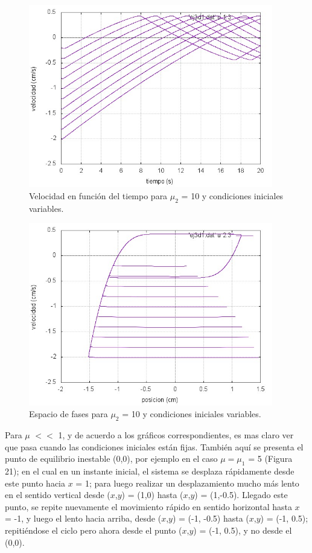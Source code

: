 \documentclass[a4paper,12pt]{article}
\begin{document}
\begin{itemize}
\begin{figure}[H]
\begin{center}
\includegraphics[height=8cm]{grafico_ej3d1_vVSt.jpg}
\caption[width=5cm]{Velocidad en funci\'on del tiempo para $\mu_2$ = 10 y condiciones iniciales variables.}
\end{center}
\end{figure}

\begin{figure}[H]
\begin{center}
\includegraphics[height=8cm]{grafico_ej3d1_xVSv.jpg}
\caption[width=5cm]{Espacio de fases para $\mu_2$ = 10 y condiciones iniciales variables.}
\end{center}
\end{figure}


Para $\mu$ $<<$ 1, y de acuerdo a los gr\'aficos correspondientes, es mas claro ver que pasa cuando las condiciones iniciales est\'an fijas.
Tambi\'en aqu\'i se presenta el punto de equilibrio inestable (0,0), por ejemplo en el caso $\mu = \mu_1$ = 5 (Figura 21); en el cual en un instante inicial, el sistema se desplaza r\'apidamente desde este punto hacia $x$ = 1; para luego realizar un desplazamiento mucho m\'as lento en el sentido vertical desde ($x$,$y$) = (1,0) hasta ($x$,$y$) = (1,-0.5).
Llegado este punto, se repite nuevamente el movimiento r\'apido en sentido horizontal hasta $x$ = -1, y luego el lento hacia arriba, desde ($x$,$y$) = (-1, -0.5) hasta ($x$,$y$) = (-1, 0.5); repiti\'endose el ciclo pero ahora desde el punto ($x$,$y$) = (-1, 0.5), y no desde el (0,0).


\end{itemize}
\end{document}
